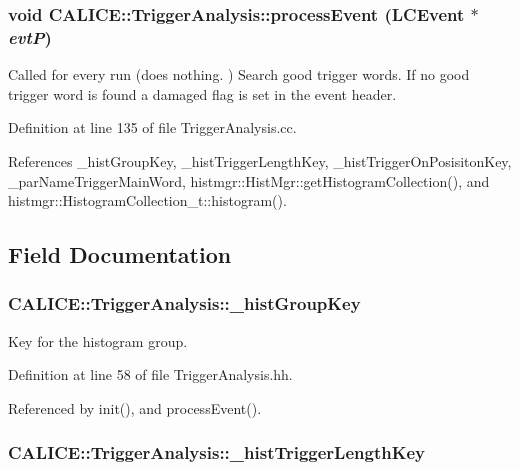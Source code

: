 \subsubsection[{processEvent}]{\setlength{\rightskip}{0pt plus 5cm}void CALICE::TriggerAnalysis::processEvent (LCEvent $\ast$ {\em evtP})}\label{classCALICE_1_1TriggerAnalysis_a687740dc2b5d83e9bbcd705dede331ef}


Called for every run (does nothing. ) Search good trigger words. If no good trigger word is found a damaged flag is set in the event header. 

Definition at line 135 of file TriggerAnalysis.cc.

References \_\-histGroupKey, \_\-histTriggerLengthKey, \_\-histTriggerOnPosisitonKey, \_\-parNameTriggerMainWord, histmgr::HistMgr::getHistogramCollection(), and histmgr::HistogramCollection\_\-t::histogram().

\subsection{Field Documentation}
\subsubsection[{\_\-histGroupKey}]{ {\bf CALICE::TriggerAnalysis::\_\-histGroupKey}\hspace{0.3cm}{\ttfamily  [private]}}\label{classCALICE_1_1TriggerAnalysis_ac6c3ea8f3ff2b56e809f4969f59704d3}


Key for the histogram group. 

Definition at line 58 of file TriggerAnalysis.hh.

Referenced by init(), and processEvent().
\subsubsection[{\_\-histTriggerLengthKey}]{ {\bf CALICE::TriggerAnalysis::\_\-histTriggerLengthKey}\hspace{0.3cm}{\ttfamily  [private]}}\label{classCALICE_1_1TriggerAnalysis_a4af95b807dcdd3389a2b64663f31e6db}


